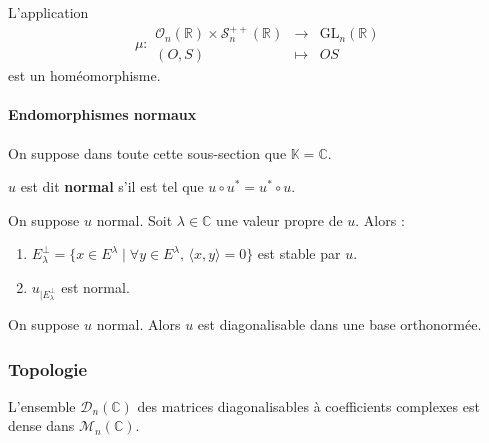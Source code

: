 	
	\begin{application}
		L'application
		\[ \mu :
		\begin{array}{ccc}
			\mathcal{O}_n(\mathbb{R}) \times \mathcal{S}_n^{++}(\mathbb{R}) &\rightarrow& \mathrm{GL}_n(\mathbb{R}) \\
			(O, S) &\mapsto& OS
		\end{array}
		\]
		est un homéomorphisme.
	\end{application}
	
	\paragraph{Endomorphismes normaux}
	
	On suppose dans toute cette sous-section que $\mathbb{K} = \mathbb{C}$.
	
	
	\begin{definition}
		$u$ est dit \textbf{normal} s'il est tel que $u \circ u^* = u^* \circ u$.
	\end{definition}
	
	\begin{proposition}
		On suppose $u$ normal. Soit $\lambda \in \mathbb{C}$ une valeur propre de $u$. Alors :
		\begin{enumerate}[label=(\roman*)]
			\item $E_\lambda^\perp = \{ x \in E^\lambda \mid \forall y \in E^\lambda, \, \langle x, y \rangle = 0 \}$ est stable par $u$.
			\item $u_{| E_\lambda^\perp}$ est normal.
		\end{enumerate}
	\end{proposition}
	
	\begin{corollary}
		On suppose $u$ normal. Alors $u$ est diagonalisable dans une base orthonormée.
	\end{corollary}
	
	\subsubsection{Topologie}
	
	\reference[BMP]{179}
	
	\begin{proposition}
		L'ensemble $\mathcal{D}_n(\mathbb{C})$ des matrices diagonalisables à coefficients complexes est dense dans $\mathcal{M}_n(\mathbb{C})$.
	\end{proposition}
	
